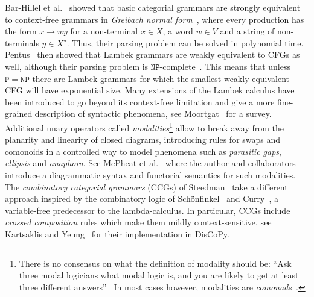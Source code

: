 Bar-Hillel et al.~\cite{Bar-HillelEtAl60} showed that basic categorial grammars are strongly equivalent to context-free grammars in \emph{Greibach normal form}~\cite{Greibach65}, where every production has the form $x \to w y$ for a non-terminal $x \in X$, a word $w \in V$ and a string of non-terminals $y \in X^\star$.
Thus, their parsing problem can be solved in polynomial time.
Pentus~\cite{Pentus93} then showed that Lambek grammars are weakly equivalent to CFGs as well, although their parsing problem is $\mathtt{NP}$-complete~\cite{Pentus06}.
This means that unless $\mathtt{P} = \mathtt{NP}$ there are Lambek grammars for which the smallest weakly equivalent CFG will have exponential size.
Many extensions of the Lambek calculus have been introduced to go beyond its context-free limitation and give a more fine-grained description of syntactic phenomena, see Moortgat~\cite{Moortgat14} for a survey.
Additional unary operators called \emph{modalities}\footnote
{There is no consensus on what the definition of modality should be: ``Ask three modal logicians what modal logic is, and you are likely to get at least three different answers''~\cite{BlackburnEtAl02}
In most cases however, modalities are \emph{comonads}~\cite{CirsteaEtAl11}.} allow to break away from the planarity and linearity of closed diagrams, introducing rules for swaps and comonoids in a controlled way to model phenomena such as \emph{parasitic gaps}, \emph{ellipsis} and \emph{anaphora}.
See McPheat et al.~\cite{McPheatEtAl21} where the author and collaborators introduce a diagrammatic syntax and functorial semantics for such modalities.
The \emph{combinatory categorial grammars} (CCGs) of Steedman~\cite{Steedman87,Steedman00} take a different approach inspired by the combinatory logic of Schönfinkel~\cite{Schonfinkel24} and Curry~\cite{Curry30}, a variable-free predecessor to the lambda-calculus.
In particular, CCGs include \emph{crossed composition} rules which make them mildly context-sensitive, see Kartsaklis and Yeung~\cite{YeungKartsaklis21} for their implementation in DisCoPy.

